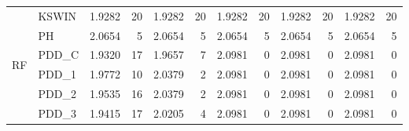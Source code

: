 \begin{table}[h]
{\begin{tabular}{llcrcrcrcrcr}
        \multirow{6}{*}{RF} & KSWIN & 1.9282 & 20 & 1.9282 & 20 & 1.9282 & 20 & 1.9282 & 20 & 1.9282 & 20 \\
         & PH & 2.0654 & 5 & 2.0654 & 5 & 2.0654 & 5 & 2.0654 & 5 & 2.0654 & 5 \\
         & PDD\_C & 1.9320 & 17 & 1.9657 & 7 & 2.0981 & 0 & 2.0981 & 0 & 2.0981 & 0 \\
         & PDD\_1 & 1.9772 & 10 & 2.0379 & 2 & 2.0981 & 0 & 2.0981 & 0 & 2.0981 & 0 \\
         & PDD\_2 & 1.9535 & 16 & 2.0379 & 2 & 2.0981 & 0 & 2.0981 & 0 & 2.0981 & 0 \\
         & PDD\_3 & 1.9415 & 17 & 2.0205 & 4 & 2.0981 & 0 & 2.0981 & 0 & 2.0981 & 0 \\\bottomrule
    \end{tabular}}
\end{table}

